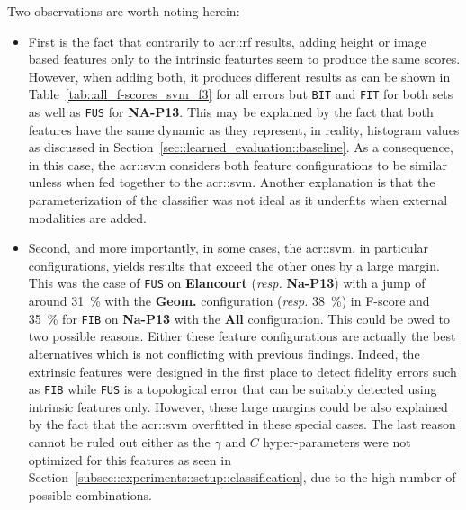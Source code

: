         Two observations are worth noting herein:
        \begin{itemize}[label=\(\blacktriangleright\)]
            \item First is the fact that contrarily to \gls{acr::rf} results, adding height or image based features only to the intrinsic featurtes seem to produce the same scores.
                    However, when adding both, it produces different results as can be shown in Table~\ref{tab::all_f-scores_svm_f3} for all errors but \texttt{BIT} and \texttt{FIT} for both sets as well as \texttt{FUS} for \textbf{NA-P13}.
                    This may be explained by the fact that both features have the same dynamic as they represent, in reality, histogram values as discussed in Section~\ref{sec::learned_evaluation::baseline}.
                    As a consequence, in this case, the \gls{acr::svm} considers both feature configurations to be similar unless when fed together to the \gls{acr::svm}.
                    Another explanation is that the parameterization of the classifier was not ideal as it underfits when external modalities are added.
            \item Second, and more importantly, in some cases, the \gls{acr::svm}, in particular configurations, yields results that exceed the other ones by a large margin.
                    This was the case of \texttt{FUS} on \textbf{Elancourt} (\textit{resp.} \textbf{Na-P13}) with a jump of around \SI{31}{\percent} with the \textbf{Geom.} configuration (\textit{resp.} \SI{38}{\percent}) in F-score and \SI{35}{\percent} for \texttt{FIB} on \textbf{Na-P13} with the \textbf{All} configuration.
                    This could be owed to two possible reasons.
                    Either these feature configurations are actually the best alternatives which is not conflicting with previous findings.
                    Indeed, the extrinsic features were designed in the first place to detect fidelity errors such as \texttt{FIB} while \texttt{FUS} is a topological error that can be suitably detected using intrinsic features only.
                    However, these large margins could be also explained by the fact that the \gls{acr::svm} overfitted in these special cases.
                    The last reason cannot be ruled out either as the \(\gamma\) and \(C\) hyper-parameters were not optimized for this features as seen in Section~\ref{subsec::experiments::setup::classification}, due to the high number of possible combinations.
            \end{itemize}
            
